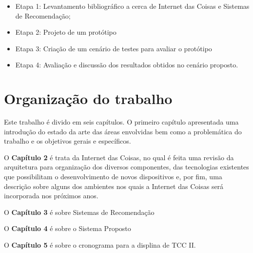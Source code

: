 \begin{itemize}
	\item Etapa 1: Levantamento bibliográfico a cerca de Internet das Coisas e Sistemas de Recomendação;
	\item Etapa 2: Projeto de um protótipo
	\item Etapa 3: Criação de um cenário de testes para avaliar o protótipo
	\item Etapa 4: Avaliação e discussão dos resultados obtidos no cenário proposto.
\end{itemize}



\section{Organização do trabalho}

Este trabalho é divido em seis capítulos. O primeiro capítulo apresentada uma introdução do estado da arte das áreas envolvidas bem como a problemática do trabalho e os objetivos gerais e específicos.

O \textbf{Capítulo 2} é trata da Internet das Coisas, no qual é feita uma revisão da arquitetura para organização dos diversos componentes, das tecnologias existentes que possibilitam o desenvolvimento de novos dispositivos e, por fim, uma descrição sobre alguns dos ambientes nos quais a Internet das Coisas será incorporada nos próximos anos.

O \textbf{Capítulo 3} é sobre Sistemas de Recomendação

O \textbf{Capítulo 4} é sobre o Sistema Proposto

O \textbf{Capítulo 5} é sobre o cronograma para a displina de TCC II.

	

